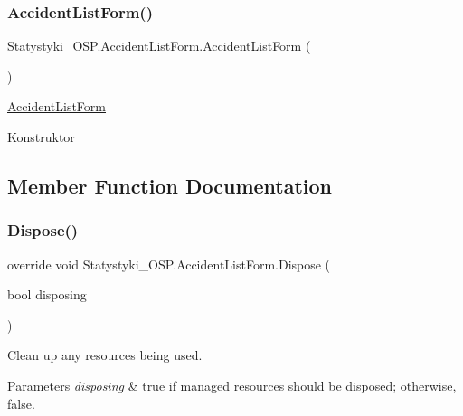 \subsubsection{\texorpdfstring{AccidentListForm()}{AccidentListForm()}}
{\footnotesize\ttfamily Statystyki\+\_\+\+O\+S\+P.\+Accident\+List\+Form.\+Accident\+List\+Form (\begin{DoxyParamCaption}{ }\end{DoxyParamCaption})}



\mbox{\hyperlink{class_statystyki___o_s_p_1_1_accident_list_form}{Accident\+List\+Form}} 

Konstruktor 

\subsection{Member Function Documentation}
\mbox{\label{class_statystyki___o_s_p_1_1_accident_list_form_a773c2b928ab147d1209dbb0a92ba5d8b}} 
\subsubsection{\texorpdfstring{Dispose()}{Dispose()}}
{\footnotesize\ttfamily override void Statystyki\+\_\+\+O\+S\+P.\+Accident\+List\+Form.\+Dispose (\begin{DoxyParamCaption}\item[{bool}]{disposing }\end{DoxyParamCaption})\hspace{0.3cm}{\ttfamily [protected]}}



Clean up any resources being used. 


\begin{DoxyParams}{Parameters}
{\em disposing} & true if managed resources should be disposed; otherwise, false.\\
\hline
\end{DoxyParams}
\mbox{\label{class_statystyki___o_s_p_1_1_accident_list_form_a6db345988cc0932d94a740c52f9a786e}} 
